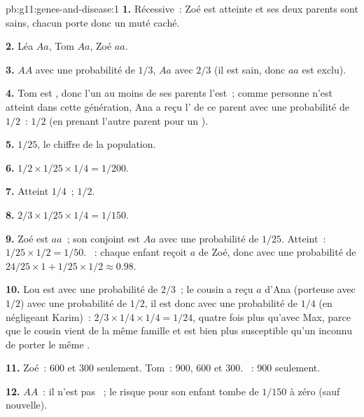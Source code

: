 \begin{solution}{pb:g11:genes-and-disease:1}
\textbf{1.} Récessive~: Zoé est atteinte et ses deux parents sont
sains, chacun porte donc un  muté caché.

\textbf{2.} Léa $Aa$, Tom $Aa$, Zoé $aa$.

\textbf{3.} $AA$ avec une probabilité de $1/3$, $Aa$ avec $2/3$ (il est
sain, donc $aa$ est exclu).

\textbf{4.} Tom est , donc l'un au moins de ses parents l'est~;
comme personne n'est atteint dans cette génération, Ana a reçu l'
de ce parent avec une probabilité de $1/2$~: $1/2$ (en prenant l'autre
parent pour un ).

\textbf{5.} $1/25$, le chiffre de la population.

\textbf{6.} $1/2 \times 1/25 \times 1/4 = 1/200$.

\textbf{7.} Atteint $1/4$~;  $1/2$.

\textbf{8.} $2/3 \times 1/25 \times 1/4 = 1/150$.

\textbf{9.} Zoé est $aa$~; son conjoint est $Aa$ avec une probabilité
de $1/25$. Atteint~: $1/25 \times 1/2 = 1/50$. ~: chaque enfant
reçoit $a$ de Zoé, donc  avec une probabilité de $24/25 \times 1 + 1/25 \times
1/2 \approx 0.98$.

\textbf{10.} Lou est  avec une probabilité de $2/3$~; le cousin
a reçu $a$ d'Ana (porteuse avec $1/2$) avec une probabilité de $1/2$,
il est donc  avec une probabilité de $1/4$ (en négligeant
Karim)~: $2/3 \times 1/4
\times 1/4 = 1/24$, quatre fois plus qu'avec Max, parce que le cousin
vient de la même famille et est bien plus susceptible qu'un inconnu de
porter le même .

\textbf{11.} Zoé~: 600 et 300 seulement. Tom~: 900, 600 et 300.
~: 900 seulement.

\textbf{12.} $AA$~: il n'est pas ~; le risque pour son enfant
tombe de $1/150$ à zéro (sauf  nouvelle).


\end{solution}
